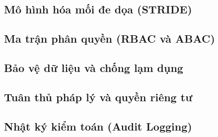 


\subsection{Mô hình hóa mối đe dọa (STRIDE)}

\subsection{Ma trận phân quyền (RBAC và ABAC)}

\subsection{Bảo vệ dữ liệu và chống lạm dụng}

\subsection{Tuân thủ pháp lý và quyền riêng tư}

\subsection{Nhật ký kiểm toán (Audit Logging)}

